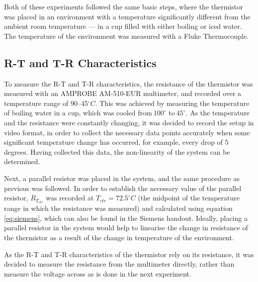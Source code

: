 \documentclass[a4,11pt]{article}
\begin{document}
Both of these experiments followed the same basic steps, where the thermistor was placed in an environment with a temperature significantly different from the ambient room temperature --- in a cup filled with either boiling or iced water. The temperature of the environment was measured with a Fluke Thermocouple.
\subsection{R-T and T-R Characteristics}
To measure the R-T and T-R characteristics, the resistance of the thermistor was measured with an AMPROBE AM-510-EUR multimeter, and recorded over a temperature range of 90--45$^{\circ}C$. This was achieved by measuring the temperature of boiling water in a cup, which was cooled from$~100^{\circ}$ to$~45^{\circ}$. As the temperature and the resistance were constantly changing, it was decided to record the setup in video format, in order to collect the necessary data points accurately when some significant temperature change has occurred, for example, every drop of 5 degrees. Having collected this data, the non-linearity of the system can be determined.

Next, a parallel resistor was placed in the system, and the same procedure as previous was followed. In order to establish the necessary value of the parallel resistor, $R_{T_{ctr}}$ was recorded at $T_{ctr}=72.5^{\circ}C$ (the midpoint of the temperature range in which the resistance was measured) and calculated using equation \ref{eq:siemens}, which can also be found in the Siemens handout. Ideally, placing a parallel resistor in the system would help to linearise the change in resistance of the thermistor as a result of the change in temperature of the environment.

As the R-T and T-R characteristics of the thermistor rely on its resistance, it was decided to measure the resistance from the multimeter directly, rather than measure the voltage across as is done in the next experiment.
\end{document}
